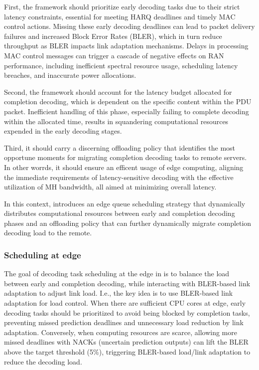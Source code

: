 First, the framework should prioritize early decoding tasks due to their strict latency constraints, essential for meeting HARQ deadlines and timely MAC control actions. Missing these early decoding deadlines can lead to packet delivery failures and increased Block Error Rates (BLER), which in turn reduce throughput as BLER impacts link adaptation mechanisms. Delays in processing MAC control messages can trigger a cascade of negative effects on RAN performance, including inefficient spectral resource usage, scheduling latency breaches, and inaccurate power allocations.

Second, the framework should account for the latency budget allocated for completion decoding, which is dependent on the specific content within the PDU packet. Inefficient handling of this phase, especially failing to complete decoding within the allocated time, results in squandering computational resources expended in the early decoding stages.

Third, it should carry a discerning offloading policy that identifies the most opportune moments for migrating completion decoding tasks to remote servers. In other worrds, it should ensure an efficent usage of edge computing, aligning the immediate requirements of latency-sensitive decoding with the effective utilization of MH bandwidth, all aimed at minimizing overall latency.

In this context, \Name{} introduces an edge queue scheduling strategy that dynamically distributes computational resources between early and completion decoding phases and an offloading policy that can further dynamically migrate completion decoding load to the remote.

\subsubsection{Scheduling at edge}
The goal of decoding task scheduling at the edge in \Name{} is to balance the load between early and completion decoding, while interacting with BLER-based link adaptation to adjust link load. I.e., the key idea is to use BLER-based link adaptation for load control.
When there are sufficient CPU cores at edge, early decoding tasks should be prioritized to avoid being blocked by completion tasks, preventing missed prediction deadlines and unnecessary load reduction by link adaptation. Conversely, when computing resources are scarce, allowing more missed deadlines with NACKs (uncertain prediction outputs) can lift the BLER above the target threshold (5\%), triggering BLER-based load/link adaptation to reduce the decoding load.

